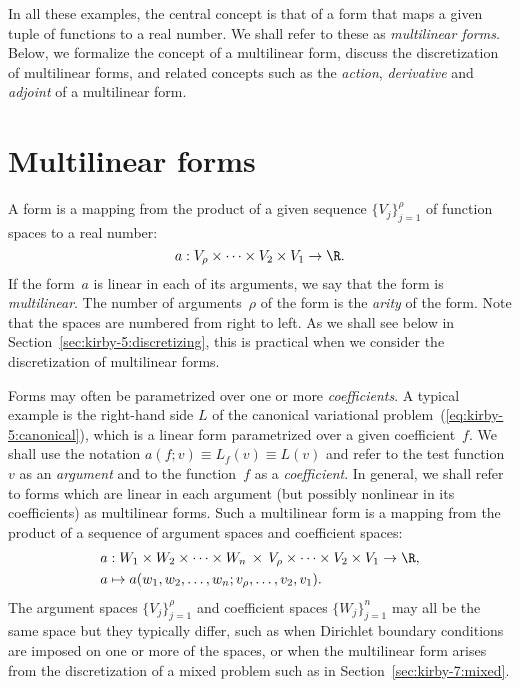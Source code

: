 In all these examples, the central concept is that of a form that maps
a given tuple of functions to a real number. We shall refer to these
as \emph{multilinear forms}. Below, we formalize the concept of a
multilinear form, discuss the discretization of multilinear forms, and
related concepts such as the \emph{action}, \emph{derivative} and
\emph{adjoint} of a multilinear form.

\section{Multilinear forms}

A form is a mapping from the product of a given sequence
$\{V_j\}_{j=1}^{\rho}$ of function spaces to a real number:
\begin{equation}
  a : V_{\rho} \times \cdots \times V_2 \times V_1 \rightarrow \R.
\end{equation}
If the form~$a$ is linear in each of its arguments, we say that the
form is \emph{multilinear}. The number of arguments~$\rho$ of the form
is the \emph{arity} of the form. Note that the spaces are numbered
from right to left. As we shall see below in
Section~\ref{sec:kirby-5:discretizing}, this is practical when we
consider the discretization of multilinear forms.

Forms may often be parametrized over one or more
\emph{coefficients}. A typical example is the right-hand side $L$ of
the canonical variational problem~(\ref{eq:kirby-5:canonical}), which
is a linear form parametrized over a given coefficient~$f$. We shall
use the notation $a(f; v) \equiv L_f(v) \equiv L(v)$ and refer to the
test function~$v$ as an \emph{argument} and to the function~$f$ as a
\emph{coefficient}. In general, we shall refer to forms which are
linear in each argument (but possibly nonlinear in its coefficients)
as multilinear forms. Such a multilinear form is a mapping from the
product of a sequence of argument spaces and coefficient spaces:
\begin{equation}
  \begin{split}
    a &: W_1 \times W_2 \times \cdots \times W_n \, \times \,
         V_{\rho} \times \cdots \times V_2 \times V_1 \rightarrow \R, \\
    a &\mapsto a(w_1, w_2, \ldots, w_n; v_{\rho}, \ldots, v_2, v_1).
  \end{split}
\end{equation}
The argument spaces $\{V_j\}_{j=1}^{\rho}$ and coefficient spaces
$\{W_j\}_{j=1}^n$ may all be the same space but they typically differ,
such as when Dirichlet boundary conditions are imposed on one or more of
the spaces, or when the multilinear form arises from the discretization
of a mixed problem such as in Section~\ref{sec:kirby-7:mixed}.

